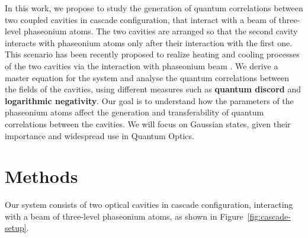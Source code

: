 \documentclass[]{article}
\begin{document}
In this work, we propose to study the generation of quantum correlations between two coupled cavities in cascade configuration, that interact with a beam of three-level phaseonium atoms. 
The two cavities are arranged so that the second cavity interacts with phaseonium atoms only after their interaction with the first one. 
This scenario has been recently proposed to realize heating and cooling processes of the two cavities via the interaction with phaseonium beam \cite{amato_heating_2024}.
We derive a master equation for the system and analyse the quantum correlations between the fields of the cavities, using different measures such as \textbf{quantum discord} and \textbf{logarithmic negativity}. 
Our goal is to understand how the parameters of the phaseonium atoms affect the generation and transferability of quantum correlations between the cavities.
We will focus on Gaussian states, given their importance and widespread use in Quantum Optics.



\section{Methods}

Our system consists of two optical cavities in cascade configuration, interacting with a beam of three-level phaseonium atoms, as shown in Figure~\ref{fig:cascade-setup}.
\end{document}
